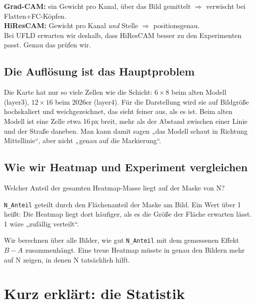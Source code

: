 \documentclass[11pt,a4paper]{article}
\newcommand{\code}[1]{\texttt{#1}}
\begin{document}
\begin{merke}
\textbf{Grad-CAM:} ein Gewicht pro Kanal, über das Bild gemittelt $\Rightarrow$ verwischt bei
Flatten+FC-Köpfen.\\
\textbf{HiResCAM:} Gewicht pro Kanal \emph{und} Stelle $\Rightarrow$ positionsgenau.\\
Bei UFLD erwarten wir deshalb, dass HiResCAM besser zu den Experimenten passt. Genau das prüfen wir.
\end{merke}

\subsection{Die Auflösung ist das Hauptproblem}

Die Karte hat nur so viele Zellen wie die Schicht: $6\times8$ beim alten Modell (layer3),
$12\times16$ beim 2026er (layer4). Für die Darstellung wird sie auf Bildgröße hochskaliert und
weichgezeichnet, das sieht feiner aus, als es ist. Beim alten Modell ist eine Zelle etwa 16\,px
breit, mehr als der Abstand zwischen einer Linie und der Straße daneben. Man kann damit sagen
„das Modell schaut in Richtung Mittellinie“, aber nicht „genau auf die Markierung“.

\subsection{Wie wir Heatmap und Experiment vergleichen}

\begin{description}[leftmargin=2.9cm, style=nextline]
  \item[\code{N\_Anteil}] Welcher Anteil der gesamten Heatmap-Masse liegt auf der Maske von N?
  \item[\code{N\_vs\_Flaeche}] \code{N\_Anteil} geteilt durch den Flächenanteil der Maske am
        Bild. Ein Wert über 1 heißt: Die Heatmap liegt dort häufiger, als es die Größe der Fläche
        erwarten lässt. 1 wäre „zufällig verteilt“.
  \item[Spearman $\rho$] Wir berechnen über alle Bilder, wie gut \code{N\_Anteil} mit dem
        gemessenen Effekt $B - A$ zusammenhängt. Eine treue Heatmap müsste in genau den Bildern
        mehr auf N zeigen, in denen N tatsächlich hilft.
\end{description}

\section{Kurz erklärt: die Statistik}
\end{document}
